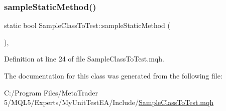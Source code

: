 \subsubsection{\texorpdfstring{sample\+Static\+Method()}{sampleStaticMethod()}}
{\footnotesize\ttfamily static bool Sample\+Class\+To\+Test\+::sample\+Static\+Method (\begin{DoxyParamCaption}{ }\end{DoxyParamCaption})\hspace{0.3cm}{\ttfamily [inline]}, {\ttfamily [static]}}



Definition at line 24 of file Sample\+Class\+To\+Test.\+mqh.



The documentation for this class was generated from the following file\+:\begin{DoxyCompactItemize}
\item 
C\+:/\+Program Files/\+Meta\+Trader 5/\+M\+Q\+L5/\+Experts/\+My\+Unit\+Test\+E\+A/\+Include/\mbox{\hyperlink{_sample_class_to_test_8mqh}{Sample\+Class\+To\+Test.\+mqh}}\end{DoxyCompactItemize}
